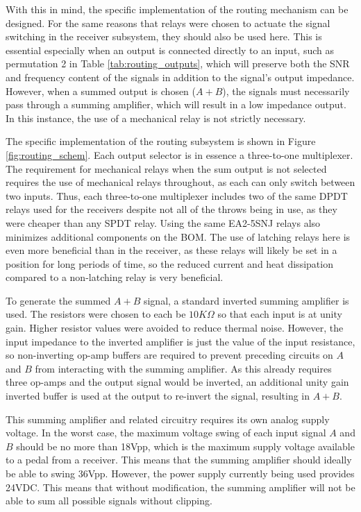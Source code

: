 \documentclass{article}
\begin{document}
	With this in mind, the specific implementation of the routing mechanism can be designed.  For the same reasons that relays were chosen to actuate the signal switching in the receiver subsystem, they should also be used here.  This is essential especially when an output is connected directly to an input, such as permutation 2 in Table \ref{tab:routing_outputs}, which will preserve both the SNR and frequency content of the signals in addition to the signal's output impedance.  However, when a summed output is chosen ($A+B$), the signals must necessarily pass through a summing amplifier, which will result in a low impedance output.  In this instance, the use of a mechanical relay is not strictly necessary.

	The specific implementation of the routing subsystem is shown in Figure \ref{fig:routing_schem}.  Each output selector is in essence a three-to-one multiplexer.  The requirement for mechanical relays when the sum output is not selected requires the use of mechanical relays throughout, as each can only switch between two inputs.  Thus, each three-to-one multiplexer includes two of the same DPDT relays used for the receivers despite not all of the throws being in use, as they were cheaper than any SPDT relay.  Using the same EA2-5SNJ relays also minimizes additional components on the BOM.  The use of latching relays here is even more beneficial than in the receiver, as these relays will likely be set in a position for long periods of time, so the reduced current and heat dissipation compared to a non-latching relay is very beneficial.

	To generate the summed $A+B$ signal, a standard inverted summing amplifier is used.  The resistors were chosen to each be $10K\Omega$ so that each input is at unity gain.  Higher resistor values were avoided to reduce thermal noise.  However, the input impedance to the inverted amplifier is just the value of the input resistance, so non-inverting op-amp buffers are required to prevent preceding circuits on $A$ and $B$ from interacting with the summing amplifier.  As this already requires three op-amps and the output signal would be inverted, an additional unity gain inverted buffer is used at the output to re-invert the signal, resulting in $A+B$.

	This summing amplifier and related circuitry requires its own analog supply voltage.  In the worst case, the maximum voltage swing of each input signal $A$ and $B$ should be no more than 18Vpp, which is the maximum supply voltage available to a pedal from a receiver.  This means that the summing amplifier should ideally be able to swing 36Vpp.  However, the power supply currently being used provides 24VDC.  This means that without modification, the summing amplifier will not be able to sum all possible signals without clipping.
\end{document}
